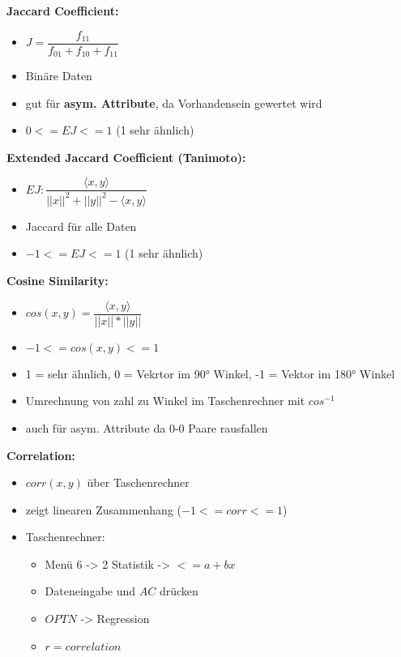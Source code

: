 \documentclass[a4paper]{article}
\begin{document}
\begin{landscape}
\begin{multicols}{3}
            \textbf{Jaccard Coefficient:}
            \begin{itemize}[noitemsep,nolistsep]
                \item $ J = \dfrac{f_{11}}{f_{01}+ f_{10}+ f_{11}} $
                \item Binäre Daten
                \item gut für \textbf{asym. Attribute}, da Vorhandensein gewertet wird
                \item $ 0 <= EJ <= 1$ (1 sehr ähnlich)

            \end{itemize}

            \textbf{Extended Jaccard Coefficient (Tanimoto):}
            \begin{itemize}[noitemsep,nolistsep]
                \item $EJ: \dfrac{\langle x, y \rangle}{||x||^2 + ||y||^2 - \langle x,y \rangle}$
                \item Jaccard für alle Daten
                \item $ -1 <= EJ <= 1$ (1 sehr ähnlich)
            \end{itemize}

            \textbf{Cosine Similarity:}
            \begin{itemize}[noitemsep,nolistsep]
                \item $cos(x,y) =  \dfrac{\langle x, y \rangle}{||x|| * ||y||}$
                \item $ -1 <= cos(x,y) <= 1$
                \item 1 = sehr ähnlich, 0 = Vekrtor im 90° Winkel, -1 = Vektor im 180° Winkel
                \item Umrechnung von zahl zu Winkel im Taschenrechner mit $cos^{-1}$
                \item auch für asym. Attribute da 0-0 Paare rausfallen
            \end{itemize}

            \textbf{Correlation:}
            \begin{itemize}[noitemsep,nolistsep]
                \item $corr(x,y)$ über Taschenrechner
                \item zeigt linearen Zusammenhang ($-1 <= corr <= 1$) 
                \item Taschenrechner:
                \begin{itemize}[noitemsep,nolistsep]
                    \item Menü 6 -> 2 Statistik -> $< = a+bx$
                    \item Dateneingabe und $AC$ drücken
                    \item $OPTN$ -> Regression
                    \item $ r = correlation $
                \end{itemize}
            \end{itemize}



\end{multicols}
\end{landscape}
\end{document}
